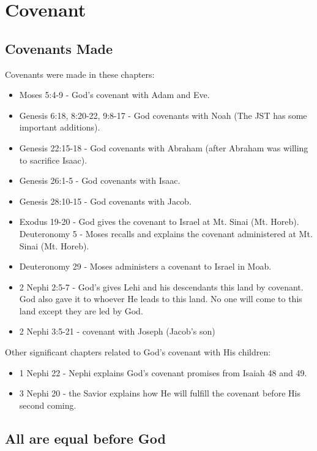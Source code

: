\chapter{Covenant}


\section{Covenants Made}

Covenants were made in these chapters:
\begin{itemize}
  \item Moses 5:4-9 - God's covenant with Adam and Eve.
  \item Genesis 6:18, 8:20-22, 9:8-17 - God covenants with Noah (The JST has some important additions).
  \item Genesis 22:15-18 - God covenants with Abraham (after Abraham was willing to sacrifice Isaac).
  \item Genesis 26:1-5 - God covenants with Isaac.
  \item Genesis 28:10-15 - God covenants with Jacob.
  \item Exodus 19-20 - God gives the covenant to Israel at Mt. Sinai (Mt. Horeb).
  \subitem Deuteronomy 5 - Moses recalls and explains the covenant administered at Mt. Sinai (Mt. Horeb).
  \item Deuteronomy 29 - Moses administers a covenant to Israel in Moab.
  \item 2 Nephi 2:5-7 - God's gives Lehi and his descendants this land by covenant.
  \subitem God also gave it to whoever He leads to this land.
  \subitem No one will come to this land except they are led by God.
  \item 2 Nephi 3:5-21 - covenant with Joseph (Jacob's son)
\end{itemize}

Other significant chapters related to God's covenant with His children:
\begin{itemize}
  \item 1 Nephi 22 - Nephi explains God's covenant promises from Isaiah 48 and 49.
  \item 3 Nephi 20 - the Savior explains how He will fulfill the covenant before His second coming.
\end{itemize}

\section{All are equal before God}

